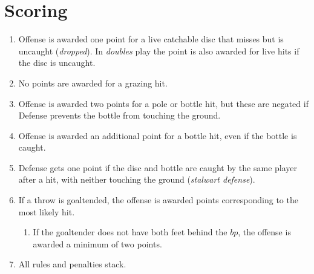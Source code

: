 \documentclass[11pt,letterpaper,twocolumn,english,DIV=calc]{scrartcl}
\begin{document}
\section{Scoring}
\begin{enumerate}
	\item \label{enu:dropped}Offense is awarded one point for a live catchable disc that misses but is uncaught (\emph{dropped}). 
	In \emph{doubles} play the point is also awarded for live hits if the disc is uncaught.
	\item No points are awarded for a grazing hit.
	\item Offense is awarded two points for a pole or bottle hit, but these are negated if Defense prevents the bottle from touching the ground.
	\item \label{enu:bottle-hit}Offense is awarded an additional point for a bottle hit, even if the bottle is caught.
	\item \label{enu:stalwart}Defense gets one point if the disc and bottle are caught by the same player after a hit, with neither touching the ground (\emph{stalwart defense}).
	\item If a throw is goaltended, the offense is awarded points corresponding to the most likely hit.

	\begin{enumerate}
		\item If the goaltender does not have both feet behind the $bp$, the offense is awarded a minimum of two points.
	\end{enumerate}

	\item All rules and penalties stack.
\end{enumerate}
\end{document}

